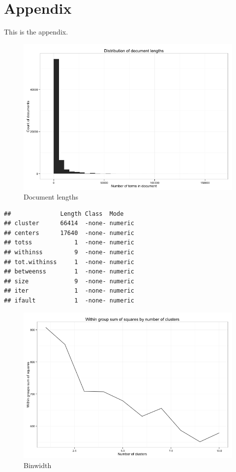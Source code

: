 \documentclass[11pt,article,oneside]{memoir}
\makeatletter
\def\maxwidth{\ifdim\Gin@nat@width>\linewidth\linewidth
\else\Gin@nat@width\fi}
\let\Oldincludegraphics\includegraphics
\renewcommand{\includegraphics}[1]{\Oldincludegraphics[width=\maxwidth]{#1}}
\makeatother
\begin{document}
\pagebreak

\section{Appendix}\label{appendix}

This is the appendix.

\begin{figure}[htbp]
\centering
\includegraphics{figure/Document-Lengths.png}
\caption{Document lengths}
\end{figure}

\begin{verbatim}
##              Length Class  Mode   
## cluster      66414  -none- numeric
## centers      17640  -none- numeric
## totss            1  -none- numeric
## withinss         9  -none- numeric
## tot.withinss     1  -none- numeric
## betweenss        1  -none- numeric
## size             9  -none- numeric
## iter             1  -none- numeric
## ifault           1  -none- numeric
\end{verbatim}

\begin{figure}[htbp]
\centering
\includegraphics{figure/Cluster-Diagnostics.png}
\caption{Binwidth}
\end{figure}
\end{document}
